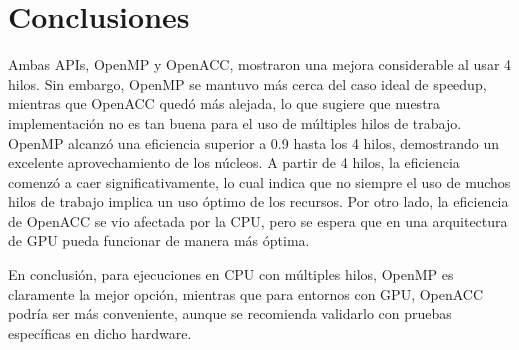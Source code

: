 \documentclass[11pt,a4paper,twocolumn]{article}
\begin{document}
%
\section{Conclusiones}
\label{sec:Conclusiones}
%
Ambas APIs, OpenMP y OpenACC, mostraron una mejora considerable al usar 4 hilos. Sin embargo, OpenMP se mantuvo más cerca del caso ideal de speedup, mientras que OpenACC quedó más alejada, 
lo que sugiere que nuestra implementación no es tan buena para el uso de múltiples hilos de trabajo. OpenMP alcanzó una eficiencia superior a 0.9 hasta los 4 hilos, demostrando un excelente aprovechamiento de los núcleos. 
A partir de 4 hilos, la eficiencia comenzó a caer significativamente, lo cual indica que no siempre el uso de muchos hilos de trabajo implica un uso óptimo de los recursos. Por otro lado, la eficiencia de OpenACC se vio afectada por la CPU,
pero se espera que en una arquitectura de GPU pueda funcionar de manera más óptima.

En conclusión, para ejecuciones en CPU con múltiples hilos, OpenMP es claramente la mejor opción, mientras que para entornos con GPU, OpenACC podría ser más conveniente, 
aunque se recomienda validarlo con pruebas específicas en dicho hardware.

\printbibliography
\end{document}
